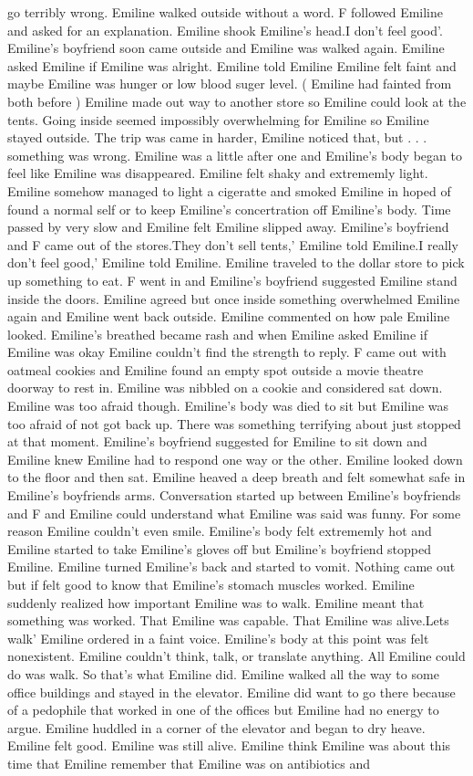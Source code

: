 \documentclass[12pt]{book}
\begin{document}
go terribly wrong. Emiline walked outside without a word. F followed Emiline and asked for an explanation. Emiline shook Emiline's head.I don't feel good'. Emiline's boyfriend soon came outside and Emiline was walked again. Emiline asked Emiline if Emiline was alright. Emiline told Emiline Emiline felt faint and maybe Emiline was hunger or low blood suger level. ( Emiline had fainted from both before ) Emiline made out way to another store so Emiline could look at the tents. Going inside seemed impossibly overwhelming for Emiline so Emiline stayed outside. The trip was came in harder, Emiline noticed that, but  . . .  something was wrong. Emiline was a little after one and Emiline's body began to feel like Emiline was disappeared. Emiline felt shaky and extrememly light. Emiline somehow managed to light a cigeratte and smoked Emiline in hoped of found a normal self or to keep Emiline's concertration off Emiline's body. Time passed by very slow and Emiline felt Emiline slipped away. Emiline's boyfriend and F came out of the stores.They don't sell tents,' Emiline told Emiline.I really don't feel good,' Emiline told Emiline. Emiline traveled to the dollar store to pick up something to eat. F went in and Emiline's boyfriend suggested Emiline stand inside the doors. Emiline agreed but once inside something overwhelmed Emiline again and Emiline went back outside. Emiline commented on how pale Emiline looked. Emiline's breathed became rash and when Emiline asked Emiline if Emiline was okay Emiline couldn't find the strength to reply. F came out with oatmeal cookies and Emiline found an empty spot outside a movie theatre doorway to rest in. Emiline was nibbled on a cookie and considered sat down. Emiline was too afraid though. Emiline's body was died to sit but Emiline was too afraid of not got back up. There was something terrifying about just stopped at that moment. Emiline's boyfriend suggested for Emiline to sit down and Emiline knew Emiline had to respond one way or the other. Emiline looked down to the floor and then sat. Emiline heaved a deep breath and felt somewhat safe in Emiline's boyfriends arms. Conversation started up between Emiline's boyfriends and F and Emiline could understand what Emiline was said was funny. For some reason Emiline couldn't even smile. Emiline's body felt extrememly hot and Emiline started to take Emiline's gloves off but Emiline's boyfriend stopped Emiline. Emiline turned Emiline's back and started to vomit. Nothing came out but if felt good to know that Emiline's stomach muscles worked. Emiline suddenly realized how important Emiline was to walk. Emiline meant that something was worked. That Emiline was capable. That Emiline was alive.Lets walk' Emiline ordered in a faint voice. Emiline's body at this point was felt nonexistent. Emiline couldn't think, talk, or translate anything. All Emiline could do was walk. So that's what Emiline did. Emiline walked all the way to some office buildings and stayed in the elevator. Emiline did want to go there because of a pedophile that worked in one of the offices but Emiline had no energy to argue. Emiline huddled in a corner of the elevator and began to dry heave. Emiline felt good. Emiline was still alive. Emiline think Emiline was about this time that Emiline remember that Emiline was on antibiotics and 
\end{document}

